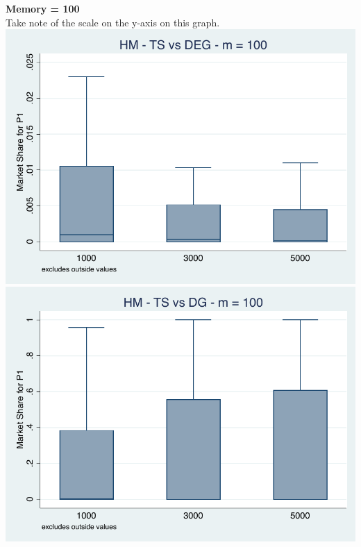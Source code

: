 \documentclass[11pt,letterpaper]{article}
\begin{document}
\pagebreak
\textbf{Memory = 100} \\
Take note of the scale on the y-axis on this graph. \\
\includegraphics[scale=0.9]{hm_ts_deg_100_timehorizon} \\ \includegraphics[scale=0.9]{hm_ts_dg_100_timehorizon}
\end{document}
